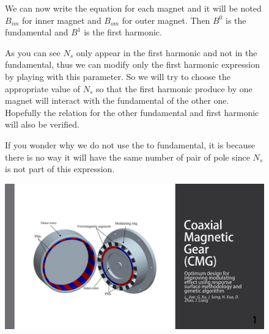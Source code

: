 \begin{figure}[H]
    \begin{minipage}{.45\linewidth}
        We can now write the equation for each magnet and it will be noted $B_{im}$ for inner magnet and $B_{om}$ for outer magnet. Then $B^0$ is the fundamental and $B^1$ is the first harmonic.
        
        As you can see $N_s$ only appear in the first harmonic and not in the fundamental, thus we can modify only the first harmonic expression by playing with this parameter. So we will try to choose the appropriate value of $N_s$ so that the first harmonic produce by one magnet will interact with the fundamental of the other one. Hopefully the relation  for the other fundamental and first harmonic will also be verified. 
        
        If you wonder why we do not use the to fundamental, it is because there is no way it will have the same number of pair of pole since $N_s$ is not part of this expression.
    \end{minipage}
    \hfill%
    \begin{minipage}[c]{.45\linewidth}
        \centering
        \includegraphics[page={24},width=\textwidth]{LELEC2311.allow.pdf}
    \end{minipage}
\end{figure}

